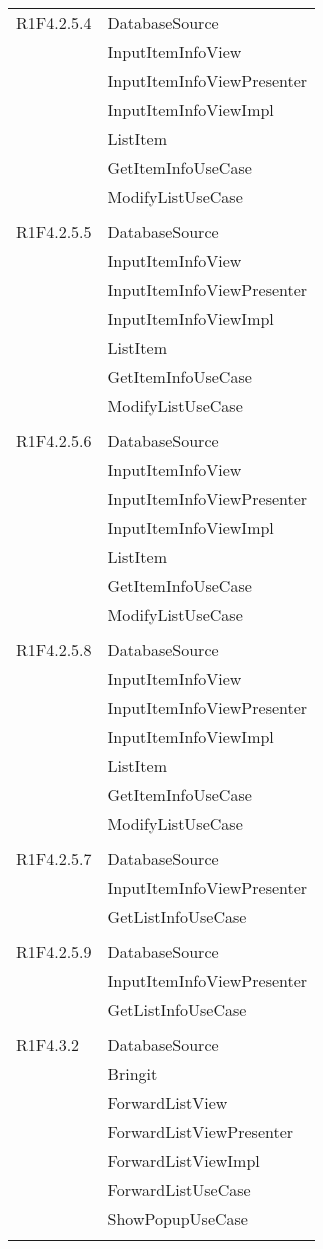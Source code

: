 \begin{center}
\begin{longtable}{|p{7cm}|p{7cm}|}
		R1F4.2.5.4 & DatabaseSource \\ & InputItemInfoView \\ & InputItemInfoViewPresenter \\ & InputItemInfoViewImpl \\ & ListItem \\ & GetItemInfoUseCase \\ & ModifyListUseCase \\ & \\ \hline
		R1F4.2.5.5 & DatabaseSource \\ & InputItemInfoView \\ & InputItemInfoViewPresenter \\ & InputItemInfoViewImpl \\ & ListItem \\ & GetItemInfoUseCase \\ & ModifyListUseCase \\ & \\ \hline
		R1F4.2.5.6 & DatabaseSource \\ & InputItemInfoView \\ & InputItemInfoViewPresenter \\ & InputItemInfoViewImpl \\ & ListItem \\ & GetItemInfoUseCase \\ & ModifyListUseCase \\ & \\ \hline
		R1F4.2.5.8 & DatabaseSource \\ & InputItemInfoView \\ & InputItemInfoViewPresenter \\ & InputItemInfoViewImpl \\ & ListItem \\ & GetItemInfoUseCase \\ & ModifyListUseCase \\ & \\ \hline
		R1F4.2.5.7 & DatabaseSource \\ & InputItemInfoViewPresenter \\ & GetListInfoUseCase \\ & \\ \hline
		R1F4.2.5.9 & DatabaseSource \\ & InputItemInfoViewPresenter \\ & GetListInfoUseCase \\ & \\ \hline
		R1F4.3.2 & DatabaseSource \\ & Bringit \\ & ForwardListView \\ & ForwardListViewPresenter \\ & ForwardListViewImpl \\ & ForwardListUseCase \\ & ShowPopupUseCase \\ & \\ \hline

\end{longtable}
\end{center}
